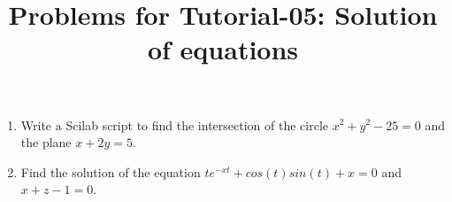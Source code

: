 \documentclass[10pt,a4paper]{article}
\begin{document}
\title{Problems for Tutorial-05: Solution of equations}
\date{}
\maketitle
\begin{enumerate}
\item Write a Scilab script to find the intersection of the circle 
$x^2 + y^2 - 25 = 0$ and the plane $x + 2y = 5$.
\item Find the solution of the equation $te^{-xt} + cos(t)sin(t) + x = 0$ and $x+z-1 = 0$.
\end{enumerate}
\end{document}
